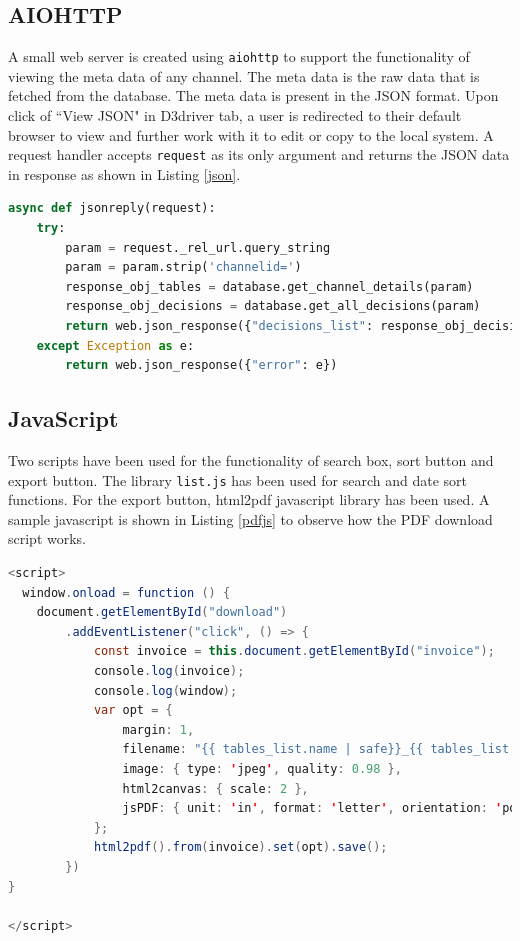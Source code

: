 \subsection{AIOHTTP}

A small web server is created using \texttt{aiohttp} to support the functionality of viewing the meta data of any channel. The meta data is the raw data that is fetched from the database. The meta data is present in the JSON format. Upon click of ``View JSON" in D3driver tab, a user is redirected to their default browser to view and further work with it to edit or copy to the local system. A request handler accepts \texttt{request} as its only argument and returns the JSON data in response as shown in Listing \ref{json}.

\begin{lstlisting}[caption=View JSON button, language=python,label=json]
async def jsonreply(request): 
    try:
        param = request._rel_url.query_string
        param = param.strip('channelid=')
        response_obj_tables = database.get_channel_details(param)
        response_obj_decisions = database.get_all_decisions(param)
        return web.json_response({"decisions_list": response_obj_decisions,"tables_list":response_obj_tables})
    except Exception as e:
        return web.json_response({"error": e})
\end{lstlisting}


\subsection{JavaScript}
Two scripts have been used for the functionality of search box, sort button and export button. The library \texttt{list.js} has been used for search and date sort functions. For the export button, html2pdf javascript library has been used. A sample javascript is shown in Listing \ref{pdfjs} to observe how the PDF download script works. 

\begin{lstlisting}[language=java,caption=PDF download script,label=pdfjs]
<script>
  window.onload = function () {
    document.getElementById("download")
        .addEventListener("click", () => {
            const invoice = this.document.getElementById("invoice");
            console.log(invoice);
            console.log(window);
            var opt = {
                margin: 1,
                filename: "{{ tables_list.name | safe}}_{{ tables_list.vphase | safe}}",
                image: { type: 'jpeg', quality: 0.98 },
                html2canvas: { scale: 2 },
                jsPDF: { unit: 'in', format: 'letter', orientation: 'portrait' }
            };
            html2pdf().from(invoice).set(opt).save();
        })
}

</script>
\end{lstlisting}

